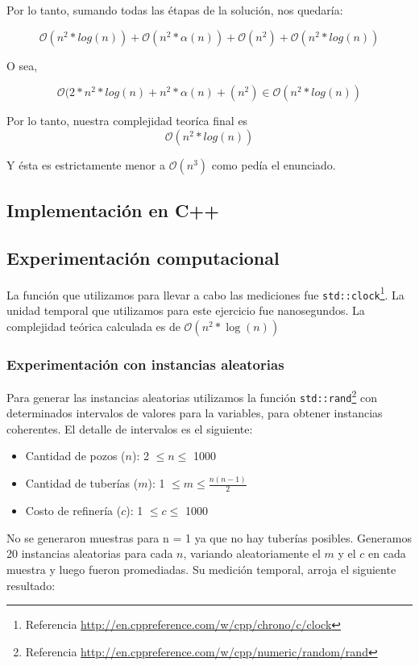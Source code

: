 Por lo tanto, sumando todas las étapas de la solución, nos quedaría:

$$\mathcal{O}(n^2*log(n)) + \mathcal{O}(n^2*\alpha(n)) + \mathcal{O}(n^2) + \mathcal{O}(n^2*log(n))$$

O sea,

$$\mathcal{O}(2*n^2*log(n) + n^2*\alpha(n) +(n^2) \in \mathcal{O}(n^2*log(n)) $$

Por lo tanto, nuestra complejidad teoríca final es
$$\mathcal{O}(n^2*log(n))$$

Y ésta es estrictamente menor a  $\mathcal{O}(n^3)$ como pedía el enunciado.

\newpage
\subsection{Implementación en C++}


\newpage
\subsection{Experimentación computacional}
La función que utilizamos para llevar a cabo las mediciones fue \texttt{std::clock}\footnote{Referencia \url{http://en.cppreference.com/w/cpp/chrono/c/clock}}. La unidad temporal que utilizamos para este ejercicio fue nanosegundos.
La complejidad teórica calculada es de $\mathcal{O}(n^2* \log(n))$


\subsubsection{Experimentación con instancias aleatorias}
Para generar las instancias aleatorias utilizamos la función \texttt{std::rand}\footnote{Referencia \url{http://en.cppreference.com/w/cpp/numeric/random/rand}} con determinados intervalos de valores para la variables, para obtener instancias coherentes. El detalle de intervalos es el siguiente:
\begin{itemize}
	\item Cantidad de pozos ($n$): 2 $\leq n \leq$ 1000
    \item Cantidad de tuberías ($m$): 1 $\leq m \leq \frac{n(n-1)}{2}$
    \item Costo de refinería ($c$): 1 $\leq c \leq$ 1000
\end{itemize}

No se generaron muestras para n = 1 ya que no hay tuberías posibles.
Generamos 20 instancias aleatorias para cada $n$, variando aleatoriamente el $m$ y el $c$ en cada muestra y luego fueron promediadas. Su medición temporal, arroja el siguiente resultado:


